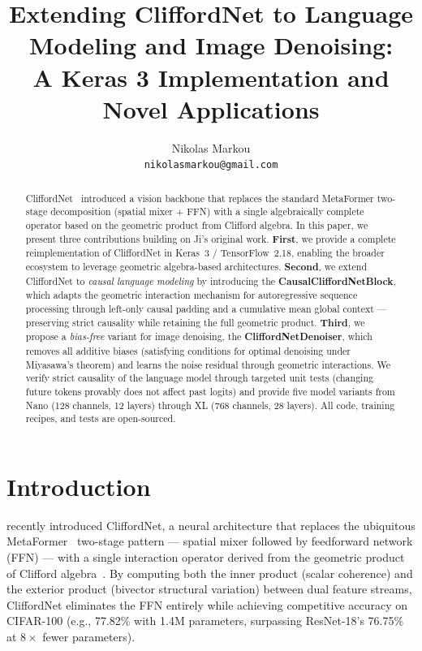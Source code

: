 \documentclass{article}
\title{Extending CliffordNet to Language Modeling and Image Denoising:\\ A Keras 3 Implementation and Novel Applications}
\author{
  Nikolas Markou \\
  \texttt{nikolasmarkou@gmail.com}
}
\date{}
\begin{document}
\maketitle

\begin{abstract}
CliffordNet~\citep{ji2026cliffordnet} introduced a vision backbone that replaces the standard MetaFormer two-stage decomposition (spatial mixer + FFN) with a single algebraically complete operator based on the geometric product from Clifford algebra.
In this paper, we present three contributions building on Ji's original work.
\textbf{First}, we provide a complete reimplementation of CliffordNet in Keras~3 / TensorFlow~2.18, enabling the broader ecosystem to leverage geometric algebra-based architectures.
\textbf{Second}, we extend CliffordNet to \emph{causal language modeling} by introducing the \textbf{CausalCliffordNetBlock}, which adapts the geometric interaction mechanism for autoregressive sequence processing through left-only causal padding and a cumulative mean global context --- preserving strict causality while retaining the full geometric product.
\textbf{Third}, we propose a \emph{bias-free} variant for image denoising, the \textbf{CliffordNetDenoiser}, which removes all additive biases (satisfying conditions for optimal denoising under Miyasawa's theorem) and learns the noise residual through geometric interactions.
We verify strict causality of the language model through targeted unit tests (changing future tokens provably does not affect past logits) and provide five model variants from Nano (128 channels, 12 layers) through XL (768 channels, 28 layers).
All code, training recipes, and tests are open-sourced.
\end{abstract}

\section{Introduction}
\label{sec:intro}

\citet{ji2026cliffordnet} recently introduced CliffordNet, a neural architecture that replaces the ubiquitous MetaFormer~\citep{yu2022metaformer} two-stage pattern --- spatial mixer followed by feedforward network (FFN) --- with a single interaction operator derived from the geometric product of Clifford algebra~\citep{hestenes1984clifford}.
By computing both the inner product (scalar coherence) and the exterior product (bivector structural variation) between dual feature streams, CliffordNet eliminates the FFN entirely while achieving competitive accuracy on CIFAR-100 (e.g., 77.82\% with 1.4M parameters, surpassing ResNet-18's 76.75\% at $8\times$ fewer parameters).
\end{document}
